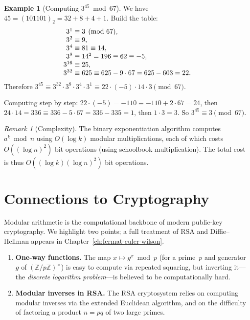 \documentclass[12pt,a4paper,openany]{book}
\theoremstyle{definition}
\newtheorem{example}[definition]{Example}
\theoremstyle{plain}
\theoremstyle{remark}
\newtheorem{remark}[definition]{Remark}
\newcommand{\Z}{\mathbb{Z}}
\begin{document}
\begin{example}[Computing $3^{45} \bmod 67$]
\label{ex:fast-exp}
We have $45 = (101101)_2 = 32 + 8 + 4 + 1$.  Build the table:
\[
\begin{array}{r@{\;}l}
  3^1  &\equiv 3 \pmod{67},  \\
  3^2  &\equiv 9,  \\
  3^4  &\equiv 81 \equiv 14,  \\
  3^8  &\equiv 14^2 = 196 \equiv 62 \equiv -5,  \\
  3^{16} &\equiv 25,  \\
  3^{32} &\equiv 625 \equiv 625 - 9\cdot 67 = 625 - 603 = 22.
\end{array}
\]
Therefore $3^{45} \equiv 3^{32} \cdot 3^{8} \cdot 3^{4} \cdot 3^{1}
\equiv 22 \cdot (-5) \cdot 14 \cdot 3 \pmod{67}$.

Computing step by step: $22 \cdot (-5) = -110 \equiv -110 + 2\cdot 67 = 24$,
then $24 \cdot 14 = 336 \equiv 336 - 5\cdot 67 = 336 - 335 = 1$,
then $1 \cdot 3 = 3$.  So $3^{45} \equiv 3 \pmod{67}$.
\end{example}

\begin{remark}[Complexity]
\label{rem:fast-exp-complexity}
The binary exponentiation algorithm computes $a^k \bmod n$ using
$O(\log k)$ modular multiplications, each of which costs $O((\log n)^2)$
bit operations (using schoolbook multiplication).  The total cost is thus
$O((\log k)(\log n)^2)$ bit operations.
\end{remark}

\section{Connections to Cryptography}
\label{sec:cong-crypto}

Modular arithmetic is the computational backbone of modern public-key
cryptography.  We highlight two points; a full treatment of RSA and
Diffie--Hellman appears in Chapter~\ref{ch:fermat-euler-wilson}.

\begin{enumerate}
  \item \textbf{One-way functions.}
        The map $x \mapsto g^x \bmod p$ (for a prime~$p$ and
        generator~$g$ of $(\Z/p\Z)^\times$) is easy to compute via
        repeated squaring, but inverting it---the
        \emph{discrete logarithm problem}---is
        believed to be computationally hard.

  \item \textbf{Modular inverses in RSA.}
        The RSA cryptosystem relies on computing modular inverses
        via the extended Euclidean algorithm, and on the difficulty
        of factoring a product $n = pq$ of two large primes.
\end{enumerate}
\end{document}
